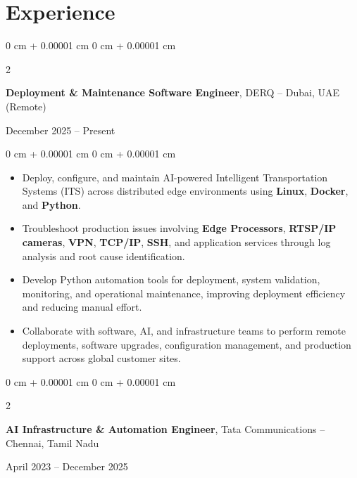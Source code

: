 \documentclass[10pt, letterpaper]{article}
\newenvironment{highlights}{
    \begin{itemize}[
        topsep=0.10 cm,
        parsep=0.10 cm,
        partopsep=0pt,
        itemsep=0pt,
        leftmargin=0 cm + 10pt
    ]
}{
    \end{itemize}
} %
\newenvironment{onecolentry}{
    \begin{adjustwidth}{
        0 cm + 0.00001 cm
    }{
        0 cm + 0.00001 cm
    }
}{
    \end{adjustwidth}
} %
\newenvironment{twocolentry}[2][]{
    \onecolentry
    \def\secondColumn{#2}
    \setcolumnwidth{\fill, 4.5 cm}
    \begin{paracol}{2}
}{
    \switchcolumn \raggedleft \secondColumn
    \end{paracol}
    \endonecolentry
} %
\begin{document}
    \section{Experience}
\begin{twocolentry}{
    December 2025 – Present
}
    \textbf{Deployment \& Maintenance Software Engineer}, DERQ -- Dubai, UAE (Remote)
\end{twocolentry}
\vspace{0.10 cm}
\begin{onecolentry}
    \begin{highlights}
        \item Deploy, configure, and maintain AI-powered Intelligent Transportation Systems (ITS) across distributed edge environments using \textbf{Linux}, \textbf{Docker}, and \textbf{Python}.
        \item Troubleshoot production issues involving \textbf{Edge Processors}, \textbf{RTSP/IP cameras}, \textbf{VPN}, \textbf{TCP/IP}, \textbf{SSH}, and application services through log analysis and root cause identification.
        \item Develop Python automation tools for deployment, system validation, monitoring, and operational maintenance, improving deployment efficiency and reducing manual effort.
        \item Collaborate with software, AI, and infrastructure teams to perform remote deployments, software upgrades, configuration management, and production support across global customer sites.
    \end{highlights}
\end{onecolentry}
\vspace{0.20cm}
\begin{twocolentry}{
    April 2023 – December 2025
}
    \textbf{AI Infrastructure \& Automation Engineer}, Tata Communications -- Chennai, Tamil Nadu
\end{twocolentry}
\vspace{0.10 cm}
\end{document}
